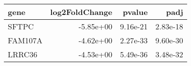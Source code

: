 \begin{tabular}{lrrr}
\toprule
   gene &  log2FoldChange &   pvalue &     padj \\
\midrule
  SFTPC &       -5.85e+00 & 9.16e-21 & 2.83e-18 \\
FAM107A &       -4.62e+00 & 2.27e-33 & 9.60e-30 \\
 LRRC36 &       -4.53e+00 & 5.49e-36 & 3.48e-32 \\
\bottomrule
\end{tabular}
